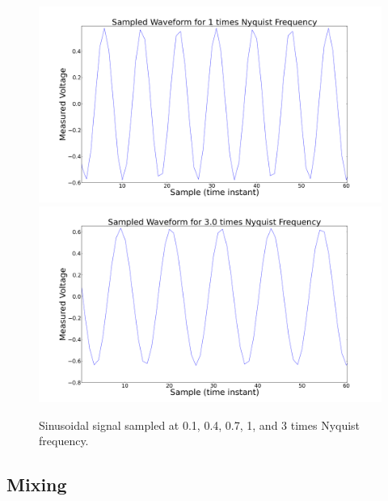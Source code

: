 \documentclass[11pt]{article}
\begin{document}
\begin{figure}
\includegraphics[scale=0.15]{pictures/onetimesnyq}
\includegraphics[scale=0.15]{pictures/triplenyq}
\caption{Sinusoidal signal sampled at 0.1, 0.4, 0.7, 1, and 3
  times Nyquist frequency. \label{nyq}}
\end{figure}

\subsection{Mixing}






\end{document}
